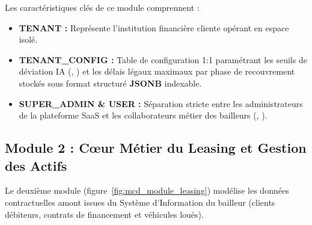 Les caractéristiques clés de ce module comprennent :
\begin{itemize}
    \item \textbf{TENANT :} Représente l'institution financière cliente opérant en espace isolé.
    \item \textbf{TENANT\_CONFIG :} Table de configuration 1:1 paramétrant les seuils de déviation IA (, ) et les délais légaux maximaux par phase de recouvrement stockés sous format structuré \textbf{JSONB} indexable.
    \item \textbf{SUPER\_ADMIN \& USER :} Séparation stricte entre les administrateurs de la plateforme SaaS et les collaborateurs métier des bailleurs (, ).
\end{itemize}

\subsection{Module 2 : Cœur Métier du Leasing et Gestion des Actifs}

Le deuxième module (figure~\ref{fig:mcd_module_leasing}) modélise les données contractuelles amont issues du Système d'Information du bailleur (clients débiteurs, contrats de financement et véhicules loués).

